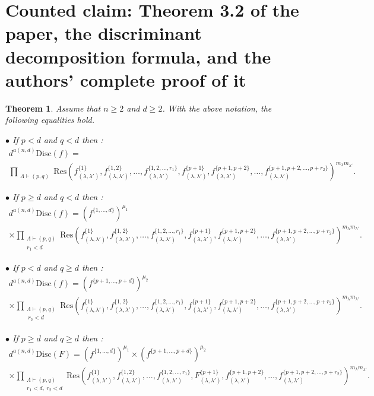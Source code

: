 \documentclass[10pt,a4paper]{amsart}
\newcommand{\Res}{\mathrm{Res}}
\newcommand{\Disc}{\mathrm{Disc}}
\newtheorem{theorem}{Theorem}
\begin{document}
\section*{Counted claim: Theorem 3.2 of the paper, the discriminant decomposition formula, and the authors' complete proof of it}
\begin{theorem}\label{thm:discmaintheorem} Assume that $n\geq 2$ and $d\geq 2$. With the above notation, the following equalities hold.

\noindent $\bullet$ If $p< d$ and $q< d$ then :
\begin{multline*}
d^{a(n,d)}\Disc\left(f\right)=\\
 \prod_{\substack{\Lambda\vdash (p,q)}}
\Res\left( f_{(\lambda,\lambda')}^{\{1\}}, f_{(\lambda,\lambda')}^{\{1,2\}}, \ldots, f_{(\lambda,\lambda')}^{\{1,2,\ldots,r_1\}},f_{(\lambda,\lambda')}^{\{p+1\}}, f_{(\lambda,\lambda')}^{\{p+1,p+2\}}, \ldots, f_{(\lambda,\lambda')}^{\{p+1,p+2,\ldots,p+r_2\}} 
\right)^{m_{\lambda}m_{\lambda'}}.
\end{multline*}


\noindent $\bullet$ If $p\geqslant d$ and $q< d$ then :
\begin{multline*}
d^{a(n,d)}\Disc\left(f\right)=
  \left(f^{\{1,\ldots,d\}}\right)^{\mu_1}\\ \times\prod_{\substack{\Lambda\vdash (p,q)\\ r_1< d}}
\Res\left( f_{(\lambda,\lambda')}^{\{1\}}, f_{(\lambda,\lambda')}^{\{1,2\}}, \ldots, f_{(\lambda,\lambda')}^{\{1,2,\ldots,r_1\}},f_{(\lambda,\lambda')}^{\{p+1\}}, f_{(\lambda,\lambda')}^{\{p+1,p+2\}}, \ldots, f_{(\lambda,\lambda')}^{\{p+1,p+2,\ldots,p+r_2\}} 
\right)^{m_{\lambda}m_{\lambda'}}.
\end{multline*}

\noindent $\bullet$ If $p< d$ and $q\geqslant d$ then :
\begin{multline*}
d^{a(n,d)}\Disc\left(f\right)=
  \left(f^{\{p+1,\ldots,p+d\}}\right)^{\mu_2}\\ \times\prod_{\substack{\Lambda\vdash (p,q)\\ \ r_2< d}}
\Res\left( f_{(\lambda,\lambda')}^{\{1\}}, f_{(\lambda,\lambda')}^{\{1,2\}}, \ldots, f_{(\lambda,\lambda')}^{\{1,2,\ldots,r_1\}},f_{(\lambda,\lambda')}^{\{p+1\}}, f_{(\lambda,\lambda')}^{\{p+1,p+2\}}, \ldots, f_{(\lambda,\lambda')}^{\{p+1,p+2,\ldots,p+r_2\}} 
\right)^{m_{\lambda}m_{\lambda'}}.
\end{multline*}

\noindent $\bullet$ If $p\geqslant d$ and $q\geqslant d$ then :
\begin{multline*}
d^{a(n,d)}\Disc\left(F\right)=
  \left(f^{\{1,\ldots,d\}}\right)^{\mu_1}\times \left(f^{\{p+1,\ldots,p+d\}}\right)^{\mu_2}\\ \times\prod_{\substack{\Lambda\vdash (p,q)\\ r_1< d,\ r_2< d}}
\Res\left( f_{(\lambda,\lambda')}^{\{1\}}, f_{(\lambda,\lambda')}^{\{1,2\}}, \ldots, f_{(\lambda,\lambda')}^{\{1,2,\ldots,r_1\}},F_{(\lambda,\lambda')}^{\{p+1\}}, f_{(\lambda,\lambda')}^{\{p+1,p+2\}}, \ldots, f_{(\lambda,\lambda')}^{\{p+1,p+2,\ldots,p+r_2\}} 
\right)^{m_{\lambda}m_{\lambda'}}.
\end{multline*}


\end{theorem}
\end{document}
